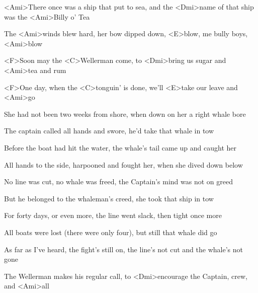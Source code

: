 
\zs
<Ami>There once was a ship that put to sea, and the <Dmi>name of that ship was the <Ami>Billy o' Tea

The <Ami>winds blew hard, her bow dipped down, <E>blow, me bully boys, <Ami>blow
\ks

\zr
<F>Soon may the <C>Wellerman come, to <Dmi>bring us sugar and <Ami>tea and rum

<F>One day, when the <C>tonguin' is done, we'll <E>take our leave and <Ami>go
\kr

\zs
She had not been two weeks from shore, when down on her a right whale bore

The captain called all hands and swore, he'd take that whale in tow
\ks

\zr\kr

\zs
Before the boat had hit the water, the whale's tail came up and caught her

All hands to the side, harpooned and fought her, when she dived down below
\ks

\zr\kr

\zs
No line was cut, no whale was freed, the Captain's mind was not on greed

But he belonged to the whaleman's creed, she took that ship in tow
\ks

\zr\kr

\zs
For forty days, or even more, the line went slack, then tight once more

All boats were lost (there were only four), but still that whale did go
\ks

\zr\kr

\zs
As far as I've heard, the fight's still on, the line's not cut and the whale's not gone

The Wellerman makes his regular call, to <Dmi>encourage the Captain, crew, and <Ami>all
\ks

\zr\kr

\kp
